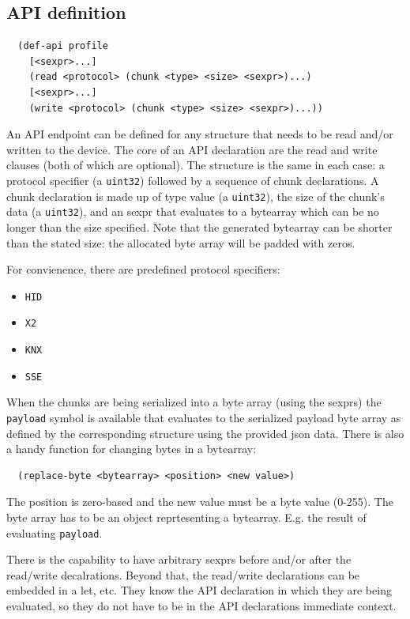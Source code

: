 \documentclass[12pt]{article}
\begin{document}
\subsection{API definition}

\begin{verbatim}
  (def-api profile
    [<sexpr>...]
    (read <protocol> (chunk <type> <size> <sexpr>)...)
    [<sexpr>...]
    (write <protocol> (chunk <type> <size> <sexpr>)...))
\end{verbatim}

\noindent An API endpoint can be defined for any structure that needs
to be read and/or written to the device. The core of an API
declaration are the read and write clauses (both of which are
optional). The structure is the same in each case: a protocol specifier
(a \verb|uint32|) followed by a sequence of chunk declarations. A chunk
declaration is made up of type value (a \verb|uint32|), the size of the chunk's
data (a \verb|uint32|), and an sexpr that evaluates to a bytearray which can be
no longer than the size specified. Note that the generated bytearray
can be shorter than the stated size: the allocated byte array will be
padded with zeros.

For convienence, there are predefined protocol specifiers:

\begin{itemize}
\item \verb|HID|
\item \verb|X2|
\item \verb|KNX|
\item \verb|SSE|
\end{itemize}

When the chunks are being serialized into a byte array (using the
sexprs) the \verb|payload| symbol is available that evaluates to the
serialized payload byte array as defined by the corresponding
structure using the provided json data. There is also a handy function
for changing bytes in a bytearray:

\begin{verbatim}
  (replace-byte <bytearray> <position> <new value>)
\end{verbatim}

The position is zero-based and the new value must be a byte value
(0-255). The byte array has to be an object reprtesenting a bytearray.
E.g. the result of evaluating \verb|payload|.

There is the capability to have arbitrary sexprs before and/or after
the read/write decalrations. Beyond that, the read/write declarations
can be embedded in a let, etc. They know the API declaration in which
they are being evaluated, so they do not have to be in the API
declarations immediate context.
\end{document}
